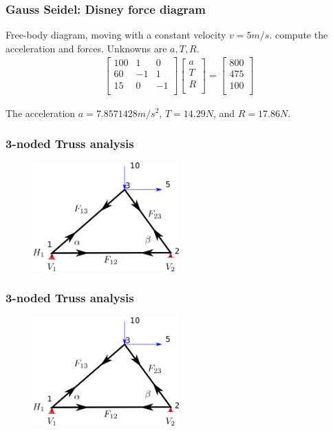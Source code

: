 \documentclass[notes]{beamer}
\begin{document}
\begin{frame}
	\frametitle{Gauss Seidel: Disney force diagram}
	Free-body diagram, moving with a constant velocity $v = 5 m/s$. compute the acceleration and forces. Unknowns are $a, T, R$.
	\begin{align*}
		\begin{bmatrix}
			100 & 1 & 0 \\
			60 & -1 & 1 \\
			15 & 0 & -1 \\
		\end{bmatrix}
		\begin{bmatrix}
			a \\
			T \\
			R \\
		\end{bmatrix} = 
		\begin{bmatrix}
		800 \\
		475 \\
		100 \\
	\end{bmatrix}
	\end{align*}

	The acceleration $a = 7.8571428 m/s^2$, $T= 14.29N$, and $R=17.86 N$.
\end{frame}
\begin{frame}
	\frametitle{3-noded Truss analysis}
	\begin{figure}[ht]
		\centering
		\includegraphics[width=0.5\textwidth]{figs/3truss.png}
	\end{figure}
	\vspace{4cm}
\end{frame}

\begin{frame}
	\frametitle{3-noded Truss analysis}
	\begin{figure}[ht]
		\centering
		\includegraphics[width=0.5\textwidth]{figs/3truss.png}
	\end{figure}
	\vspace{4cm}
\end{frame}
\end{document}
